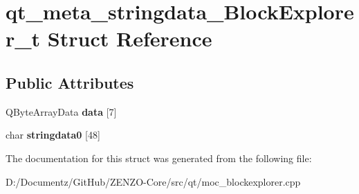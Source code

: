 \hypertarget{structqt__meta__stringdata___block_explorer__t}{}\section{qt\+\_\+meta\+\_\+stringdata\+\_\+\+Block\+Explorer\+\_\+t Struct Reference}
\label{structqt__meta__stringdata___block_explorer__t}
\subsection*{Public Attributes}
\begin{DoxyCompactItemize}
\item 
\mbox{\label{structqt__meta__stringdata___block_explorer__t_a1513d779a9648e928344de9331a6df63}} 
Q\+Byte\+Array\+Data {\bfseries data} \mbox{[}7\mbox{]}
\item 
\mbox{\label{structqt__meta__stringdata___block_explorer__t_af8bb3ee2e88216bac91254a3398b0231}} 
char {\bfseries stringdata0} \mbox{[}48\mbox{]}
\end{DoxyCompactItemize}


The documentation for this struct was generated from the following file\+:\begin{DoxyCompactItemize}
\item 
D\+:/\+Documentz/\+Git\+Hub/\+Z\+E\+N\+Z\+O-\/\+Core/src/qt/moc\+\_\+blockexplorer.\+cpp\end{DoxyCompactItemize}
